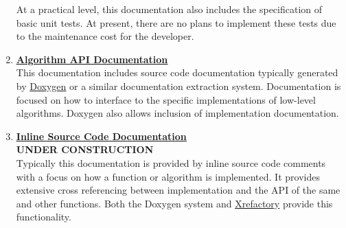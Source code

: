 \documentclass[12pt]{article}
\begin{document}
\begin{enumerate}
  At a practical level, this documentation also includes the
  specification of basic unit tests.  At present, there are no plans
  to implement these tests due to the maintenance cost for the
  developer.

\item \href{http://neurospaces.sourceforge.net/doxygen-menu.html}{\bf \underline{Algorithm API Documentation}}\\
  This documentation includes source code documentation typically
  generated by \href{http://www.stack.nl/~dimitri/doxygen/}{Doxygen}
  or a similar documentation extraction system.  Documentation is
  focused on how to interface to the specific implementations of
  low-level algorithms. Doxygen also allows inclusion of
  implementation documentation.

\item \href{../contents-level7/contents-level7.tex}{\bf \underline{Inline Source Code Documentation}}\\
  {\bf UNDER CONSTRUCTION}\\
  Typically this documentation is provided by inline source code
  comments with a focus on how a function or algorithm is implemented.
  It provides extensive cross referencing between implementation and
  the API of the same and other functions.
  Both the Doxygen system and \href {http://www.xref.sk/xrefactory/main.html}{Xrefactory} provide this
  functionality.
  








\end{enumerate}
\end{document}
